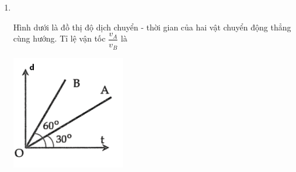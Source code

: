 \begin{enumerate}[label=\bfseries Câu \arabic*:]
\item {}\\
{\begin{minipage}[l]{0.7\textwidth}
		Hình dưới là đồ thị độ dịch chuyển - thời gian của hai vật chuyển động thẳng cùng hướng. Tỉ lệ vận tốc $\dfrac{v_A}{v_B}$ là
	\end{minipage}
	\begin{minipage}{0.3\textwidth}
		\begin{center}
			\includegraphics[width=0.7\linewidth]{../figs/VN10-2023-PH-TP005-P-8}
		\end{center}
	\end{minipage}
}


\end{enumerate}

